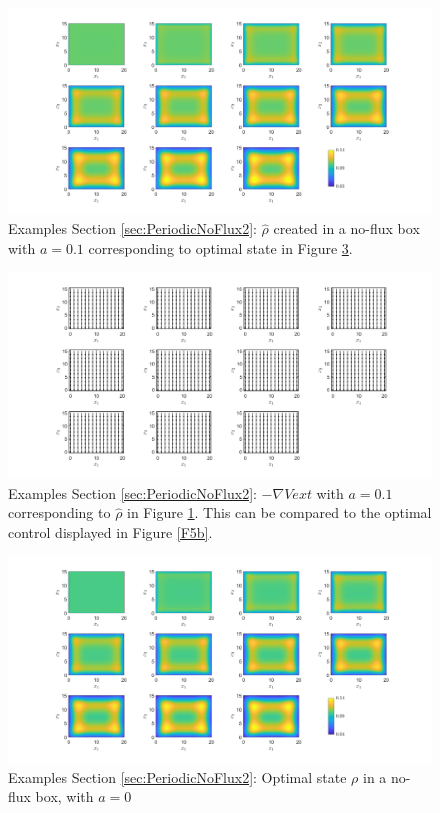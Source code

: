 \documentclass[11pt, a4paper]{article}
\theoremstyle{definition}
\newcommand{\hr}{\widehat \rho}
\begin{document}
\begin{figure}[h]
	\centering
	\includegraphics[scale=0.35]{rhoHatPeri5.png}
	\caption{Examples Section \ref{sec:PeriodicNoFlux2}: $\hr$ created in a no-flux box with $a = 0.1$ corresponding to optimal state in Figure \ref{F5a}.} 
	\label{F5}
\end{figure}
\begin{figure}[h]
	\centering
	\includegraphics[scale=0.35]{GradVext5.png}
	\caption{Examples Section \ref{sec:PeriodicNoFlux2}: $-\nabla Vext$ with $a = 0.1$ corresponding to $\hr$ in Figure \ref{F5}. This can be compared to the optimal control displayed in Figure \ref{F5b}.} 
	\label{F5V}
\end{figure}
\begin{figure}[h]
	\centering
	\includegraphics[scale=0.35]{rhoOptPeri5.png}
	\caption{Examples Section \ref{sec:PeriodicNoFlux2}: Optimal state $\rho$ in a no-flux box, with $a = 0$} 
	\label{F5a}
\end{figure}
\end{document}
